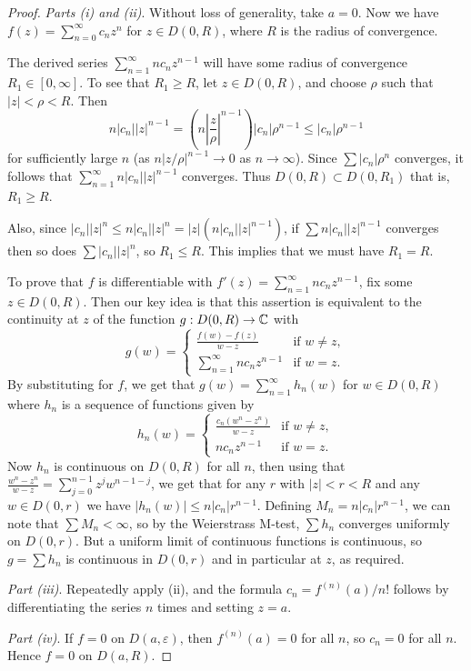 \documentclass[a4paper]{scrartcl}
\begin{document}
\begin{proof}
    \emph{Parts (i) and (ii)}. Without loss of generality, take $a = 0$. Now we have $f(z) = \sum_{n = 0}^{\infty} c_n z^n$ for $z \in D(0, R)$, where $R$ is the radius of convergence.

    The derived series $\sum_{n = 1}^{\infty} n c_n z^{n - 1}$ will have some radius of convergence $R_1 \in [0, \infty]$. To see that $R_1 \geq R$, let $z \in D(0, R)$, and choose $\rho$ such that $|z| < \rho < R$. Then
    $$
n|c_n||z|^{n - 1} = \left(n \left|\frac{z}{\rho}\right|^{n - 1}\right)|c_n|\rho^{n - 1} \leq |c_n|\rho^{n - 1}
    $$
    for sufficiently large $n$ (as $n |z/\rho|^{n - 1} \rightarrow 0$ as $n \rightarrow \infty$). Since $\sum |c_n| \rho^n$ converges, it follows that $\sum_{n = 1}^{\infty} n|c_n||z|^{n - 1}$ converges. Thus $D(0, R) \subset D(0, R_1)$ that is, $R_1 \geq R$.

    Also, since $|c_n||z|^n \leq n |c_n| |z|^n = |z|(n |c_n||z|^{n - 1})$, if $\sum n |c_n||z|^{n - 1}$ converges then so does $\sum |c_n||z|^n$, so $R_1 \leq R$. This implies that we must have $R_1 = R$.

    To prove that $f$ is differentiable with $f'(z) = \sum_{n = 1}^{\infty} n c_n z^{n - 1}$, fix some $z \in D(0, R)$. Then our key idea is that this assertion is equivalent to the continuity at $z$ of the function $g: D(0, R) \rightarrow \mathbb{C}$ with
    $$
    g(w) =\begin{cases}
        \frac{f(w) -f(z)}{w - z} &\mbox{if } w \neq z, \\
        \sum_{n = 1}^{\infty} n c_n z^{n - 1} &\mbox{if } w = z.
       \end{cases}
    $$
    By substituting for $f$, we get that $g(w) = \sum_{n = 1}^{\infty} h_n(w)$ for $w \in D(0, R)$ where $h_n$ is a sequence of functions given by
    $$
h_n(w) = \begin{cases}
    \frac{c_n(w^n - z^n)}{w - z} &\mbox{if } w \neq z, \\
    n c_n z^{n - 1} &\mbox{if } w = z.
   \end{cases}
    $$
    Now $h_n$ is continuous on $D(0, R)$ for all $n$, then using that $\frac{w^n - z^n}{w - z} = \sum_{j = 0}^{n - 1} z^j w^{n - 1 - j}$, we get that for any $r$ with $|z| < r < R$ and any $w \in D(0, r)$ we have $|h_n(w)| \leq n|c_n|r^{n - 1}$. Defining $M_n = n |c_n|r^{n - 1}$, we can note that $\sum M_n < \infty$, so by the Weierstrass M-test, $\sum h_n$ converges uniformly on $D(0, r)$. But a uniform limit of continuous functions is continuous, so $g = \sum h_n$ is continuous in $D(0, r)$ and in particular at $z$, as required.

    \emph{Part (iii)}. Repeatedly apply (ii), and the formula $c_n = f^{(n)}(a)/n!$ follows by differentiating the series $n$ times and setting $z = a$.

    \emph{Part (iv)}. If $f = 0$ on $D(a, \varepsilon)$, then $f^{(n)}(a) = 0$ for all $n$, so $c_n = 0$ for all $n$. Hence $f = 0$ on $D(a, R)$.
\end{proof}
\end{document}
